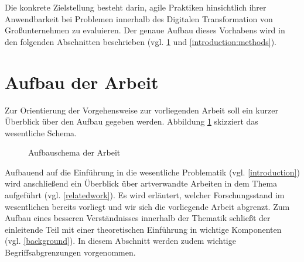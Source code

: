 Die konkrete Zielstellung besteht darin, agile Praktiken hinsichtlich ihrer Anwendbarkeit bei Problemen innerhalb des Digitalen Transformation von Großunternehmen zu evaluieren. Der genaue Aufbau dieses Vorhabens wird in den folgenden Abschnitten beschrieben (vgl. \ref{introduction:schema} und \ref{introduction:methods}).

\section{Aufbau der Arbeit}
\label{introduction:schema}

Zur Orientierung der Vorgehensweise zur vorliegenden Arbeit soll ein kurzer Überblick über den Aufbau gegeben werden. Abbildung \ref{fig:aufbau} skizziert das wesentliche Schema.


\begin{figure}[H]
	\centering
	\caption{Aufbauschema der Arbeit}
	\label{fig:aufbau}
\end{figure}

Aufbauend auf die Einführung in die wesentliche Problematik  (vgl. \ref{introduction}) wird anschließend ein Überblick über artverwandte Arbeiten in dem Thema aufgeführt (vgl. \ref{relatedwork}). Es wird erläutert, welcher Forschungsstand im wesentlichen bereits vorliegt und wir sich die vorliegende Arbeit abgrenzt. Zum Aufbau eines besseren Verständnisses innerhalb der Thematik schließt der einleitende Teil mit einer theoretischen Einführung in wichtige Komponenten (vgl. \ref{background}). In diesem Abschnitt werden zudem wichtige Begriffsabgrenzungen vorgenommen.


